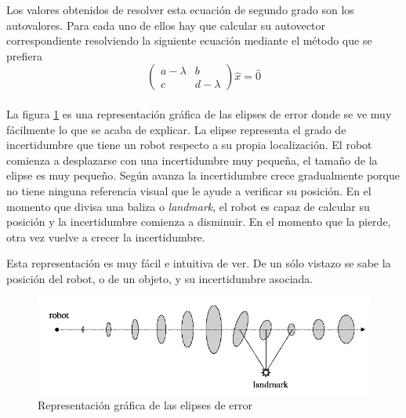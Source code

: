 Los valores obtenidos de resolver esta ecuación de segundo grado son los autovalores. Para cada uno de ellos hay que calcular su autovector correspondiente resolviendo la siguiente ecuación mediante el método que se prefiera
\begin{equation}
  \begin{pmatrix} a - \lambda & b \\ c & d - \lambda \end{pmatrix} \hat{x} = \hat{0}
\end{equation} \\

La figura \ref{fig:elipses} es una representación gráfica de las elipses de error donde se ve muy fácilmente lo que se acaba de explicar. La elipse representa el grado de incertidumbre que tiene un robot respecto a su propia localización. El robot comienza a desplazarse con una incertidumbre muy pequeña, el tamaño de la elipse es muy pequeño. Según avanza la incertidumbre crece gradualmente porque no tiene ninguna referencia visual que le ayude a verificar su posición. En el momento que divisa una baliza o \textit{landmark}, el robot es capaz de calcular su posición y la incertidumbre comienza a disminuir. En el momento que la pierde, otra vez vuelve a crecer la incertidumbre.

Esta representación es muy fácil e intuitiva de ver. De un sólo vistazo se sabe la posición del robot, o de un objeto, y su incertidumbre asociada. \\

\begin{figure} [h]
  \begin{center}
    \includegraphics[width=15cm]{img/cap3/elipses}
  \end{center}
  \caption{Representación gráfica de las elipses de error}
  \label{fig:elipses}
\end{figure}

